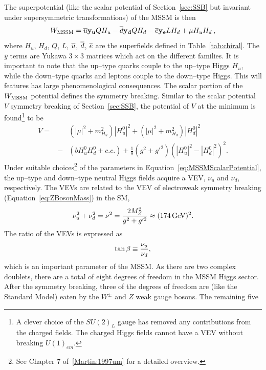 The superpotential (like the scalar potential of Section~\ref{sec:SSB} but
invariant under supersymmetric transformations) of the MSSM is
then~\cite{Martin:1997um}
\begin{equation}
  W_{\rm MSSM} =
  \overline u {\bf y_u} Q H_u -
  \overline d {\bf y_d} Q H_d -
  \overline e {\bf y_e} L H_d +
  \mu H_u H_d \>,
\end{equation}
where $H_u$, $H_d$, $Q$, $L$, $\overline u$, $\overline d$, $\overline e$ are the
superfields defined in Table~\ref{tab:chiral}.  The $\overline y$ terms are
Yukawa $3 \times 3$ matrices which act on the different families.  It is
important to note that the up--type quarks couple to the up--type Higgs $H_u$,
while the down--type quarks and leptons couple to the down--type Higgs.  This
will features has large phenomenological consequences.  The scalar portion of
the $W_{\rm MSSM}$ potential defines the symmetry breaking.  Similar to the
scalar potential $V$ symmetry breaking of Section~\ref{sec:SSB}, the potential
of $V$ at the minimum is found\footnote{A clever choice of the $SU(2)_L$ gauge
has removed any contributions from the charged fields.  The charged Higgs fields
cannot have a VEV without breaking $U(1)_{em}$.} to be 
\begin{eqnarray}
  V =& &(|\mu|^2 + m^2_{H_u})|H^0_u|^2 + (|\mu|^2 + m^2_{H_d})|H^0_d|^2
  \nonumber \\ 
   &- &(b H^0_u H^0_d + c.c.) + \frac{1}{8}(g^2 + g'^2)(|H^0_u|^2 - |H^0_d|^2)^2.
  \label{eq:MSSMScalarPotential}
\end{eqnarray}
Under suitable choices\footnote{See Chapter 7 of~\ref{Martin:1997um} for a
detailed overview.} of the parameters in Equation~\ref{eq:MSSMScalarPotential},
the up--type and down--type neutral Higgs fields acquire a VEV, $\nu_u$ and
$\nu_d$, respectively.  The VEVs are related to the VEV of electroweak
symmetry breaking (Equation~\ref{eq:ZBosonMass}) in the SM,
\begin{equation}
  \nu_u^2 + \nu_d^2 = \nu^2 = \frac{2 M_Z^2}{g^2 + g'^2} \approx (174 \,\text{Ge\hspace{-.08em}V})^2.
  \nonumber
\end{equation}
The ratio of the VEVs is expressed as
\begin{equation}
  \tan\beta \equiv \frac{\nu_u}{\nu_d},
  \nonumber
\end{equation}
which is an important parameter of the MSSM\@.  As there are two complex doublets,
there are a total of eight degrees of freedom in the MSSM Higgs sector.  After
the symmetry breaking, three of the degrees of freedom are (like the Standard
Model) eaten by the $W^\pm$ and $Z$ weak gauge bosons.  The remaining five
